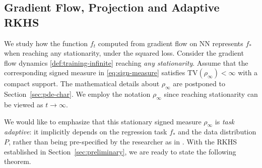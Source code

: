\documentclass[11pt]{article}
\numberwithin{equation}{section}
\begin{document}
\subsection{Gradient Flow, Projection and Adaptive RKHS}


We study how the function $f_t$ computed from gradient flow on NN represents $f_*$ when reaching any stationarity, under the squared loss. 
Consider the gradient flow dynamics \eqref{def:training-infinite} reaching \textit{any stationarity}. Assume that the corresponding signed measure in \eqref{eq:sign-measure} satisfies $\text{TV}(\rho_{\infty}) < \infty$ with a compact support. The mathematical details about $\rho_\infty$ are postponed to Section~\ref{sec:pde-char}. We employ the notation $\rho_{\infty}$ since reaching stationarity can be viewed as $t\rightarrow \infty$. 




We would like to emphasize that this stationary signed measure $\rho_{\infty}$ is \textit{task adaptive}: it implicitly depends on the regression task $f_*$ and the data distribution $P$, rather than being pre-specified by the researcher as in \cite{bach2017breaking, daniely2016toward, cho2009kernel}. With the RKHS established in Section~\ref{sec:preliminary}, we are ready to state the following theorem.

    
    
\end{document}
